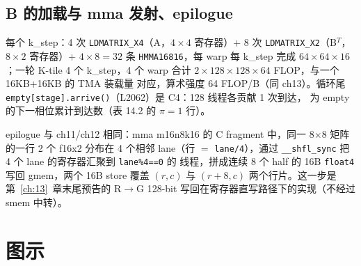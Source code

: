 \subsection{B 的加载与 mma 发射、epilogue}



每个 k\_step：4 次 \texttt{LDMATRIX\_X4}（A，$4\times4$ 寄存器）+
8 次 \texttt{LDMATRIX\_X2}（B$^T$，$8\times2$ 寄存器）+
$4 \times 8 = 32$ 条 \texttt{HMMA16816}，每 warp 每 k\_step 完成
$64 \times 64 \times 16$；一轮 K-tile 4 个 k\_step，4 个 warp 合计
$2 \times 128 \times 128 \times 64$ FLOP，与一个 16KB+16KB 的 TMA 装载量
对应，算术强度 64 FLOP/B（同 ch13）。循环尾
\texttt{empty[stage].\allowbreak{}arrive\allowbreak{}()}（L2062）是 C4：128 线程各贡献 1 次到达，
为 empty 的下一相位累计到达数（表 14.2 的 $\pi = 1$ 行）。



epilogue 与 ch11/ch12 相同：mma m16n8k16 的 C fragment 中，同一 8$\times$8
矩阵的一行 2 个 f16x2 分布在 4 个相邻 lane（行 $=$ \texttt{lane/4}），通过
\texttt{\_\_shfl\_sync} 把 4 个 lane 的寄存器汇聚到 \texttt{lane\%4==0} 的
线程，拼成连续 8 个 half 的 16B \texttt{float4} 写回 gmem，两个 16B store
覆盖 $(r, c)$ 与 $(r{+}8, c)$ 两个行片。这一步是第~\ref{ch:13}~章末尾预告的
R$\to$G 128-bit 写回在寄存器直写路径下的实现（不经过 smem 中转）。

\needspace{100mm}

\section{图示}

